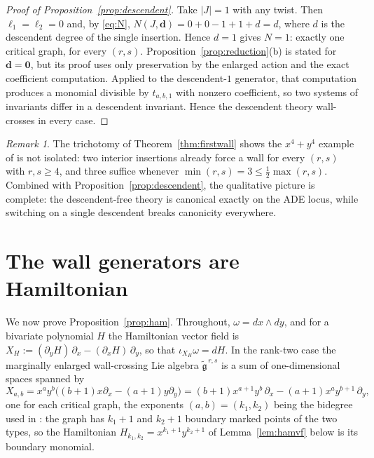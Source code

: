 \documentclass[11pt]{amsart}
\theoremstyle{definition}
\theoremstyle{remark}
\newtheorem{remark}[theorem]{Remark}
\newcommand{\gfrak}{\mathfrak{g}}
\begin{document}
\begin{proof}[Proof of Proposition~\ref{prop:descendent}]
Take $|J|=1$ with any twist. Then $\ell_{1}=\ell_{2}=0$ and, by \eqref{eq:N},
$N(J,\mathbf d)=0+0-1+1+d=d$, where $d$ is the descendent degree of the single
insertion. Hence $d=1$ gives $N=1$: exactly one critical graph, for every
$(r,s)$. Proposition~\ref{prop:reduction}(b) is stated for
$\mathbf d=\mathbf 0$, but its proof uses only preservation by the enlarged
action and the exact coefficient computation. Applied to the descendent-$1$
generator, that computation produces a monomial divisible by $t_{a,b,1}$ with
nonzero coefficient, so two systems of invariants differ in a descendent
invariant. Hence the descendent theory wall-crosses in every case.
\end{proof}

\begin{remark}
The trichotomy of Theorem~\ref{thm:firstwall} shows the $x^{4}+y^{4}$ example of
\cite{GKTsurvey} is not isolated: two interior insertions already force a wall
for every $(r,s)$ with $r,s\geq4$, and three suffice whenever
$\min(r,s)=3\leq\frac12\max(r,s)$. Combined with
Proposition~\ref{prop:descendent}, the qualitative picture is complete: the
descendent-free theory is canonical exactly on the ADE locus, while switching on
a single descendent breaks canonicity everywhere.
\end{remark}

\section{The wall generators are Hamiltonian}
\label{sec:hamiltonian}

We now prove Proposition~\ref{prop:ham}. Throughout, $\omega=dx\wedge dy$, and
for a bivariate polynomial $H$ the Hamiltonian vector field is
$X_{H}:=(\partial_{y}H)\,\partial_{x}-(\partial_{x}H)\,\partial_{y}$, so that
$\iota_{X_{H}}\omega=dH$. In the rank-two case the marginally enlarged
wall-crossing Lie algebra $\widetilde{\gfrak}^{\,r,s}$ is a sum of
one-dimensional spaces spanned by
\begin{equation}
\label{eq:Xab}
X_{a,b}=x^{a}y^{b}\bigl((b+1)x\partial_{x}-(a+1)y\partial_{y}\bigr)
=(b+1)x^{a+1}y^{b}\,\partial_{x}-(a+1)x^{a}y^{b+1}\,\partial_{y},
\end{equation}
one for each critical graph, the exponents $(a,b)=(k_{1},k_{2})$ being the
bidegree used in \cite[Definition~4.23]{GKT}: the graph has $k_{1}{+}1$ and
$k_{2}{+}1$
boundary marked points of the two types, so the Hamiltonian
$H_{k_{1},k_{2}}=x^{k_{1}+1}y^{k_{2}+1}$ of Lemma~\ref{lem:hamvf} below is its
boundary monomial.
\end{document}
